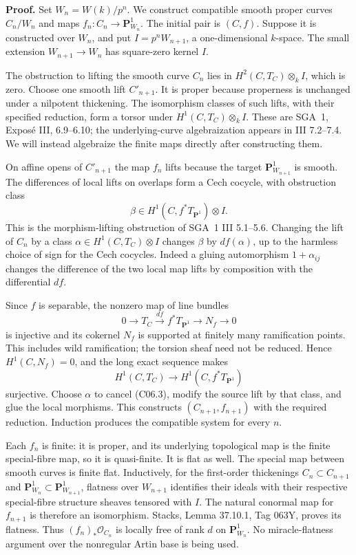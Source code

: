 \documentclass[11pt]{article}
\theoremstyle{remark}\newtheorem{remark}[theorem]{Remark}
\begin{document}
\textbf{Proof.}
Set $W_n=W(k)/p^n$. We construct compatible smooth proper
curves $C_n/W_n$ and maps $f_n:C_n\to\mathbf P^1_{W_n}$.
The initial pair is $(C,f)$. Suppose it is constructed over
$W_n$, and put $I=p^nW_{n+1}$, a one-dimensional $k$-space.
The small extension $W_{n+1}\to W_n$ has square-zero kernel $I$.

The obstruction to lifting the smooth curve $C_n$ lies in
$H^2(C,T_C)\otimes_k I$, which is zero. Choose one smooth lift
$C'_{n+1}$. It is proper because properness is unchanged under
a nilpotent thickening. The isomorphism classes of such lifts,
with their specified reduction, form a torsor under
$H^1(C,T_C)\otimes_k I$. These are SGA~1, Expos\'e III,
6.9--6.10; the underlying-curve algebraization appears in
III 7.2--7.4. We will instead algebraize the finite maps
directly after constructing them.

On affine opens of $C'_{n+1}$ the map $f_n$ lifts because the
target $\mathbf P^1_{W_{n+1}}$ is smooth. The differences of
local lifts on overlaps form a Cech cocycle, with obstruction
class
\[
                       \beta\in H^1(C,f^*T_{\mathbf P^1})\otimes I.
                                                               \tag{C06.3}
\]
This is the morphism-lifting obstruction of SGA~1 III 5.1--5.6.
Changing the lift of $C_n$ by a class
$\alpha\in H^1(C,T_C)\otimes I$ changes $\beta$ by
$df(\alpha)$, up to the harmless choice of sign for the
Cech cocycles. Indeed a gluing automorphism $1+\alpha_{ij}$
changes the difference of the two local map lifts by
composition with the differential $df$.

Since $f$ is separable, the nonzero map of line bundles
\[
       0\longrightarrow T_C\xrightarrow{df}f^*T_{\mathbf P^1}
                         \longrightarrow N_f\longrightarrow0
                                                               \tag{C06.4}
\]
is injective and its cokernel $N_f$ is supported at finitely
many ramification points. This includes wild ramification;
the torsion sheaf need not be reduced.
Hence $H^1(C,N_f)=0$, and the long exact sequence makes
\[
              H^1(C,T_C)\longrightarrow H^1(C,f^*T_{\mathbf P^1})
\]
surjective. Choose $\alpha$ to cancel (C06.3), modify the
source lift by that class, and glue the local morphisms.
This constructs $(C_{n+1},f_{n+1})$ with the required reduction.
Induction produces the compatible system for every $n$.

Each $f_n$ is finite: it is proper, and its underlying
topological map is the finite special-fibre map, so it is
quasi-finite. It is flat as well. The special map between
smooth curves is finite flat. Inductively, for the first-order
thickenings $C_n\subset C_{n+1}$ and
$\mathbf P^1_{W_n}\subset\mathbf P^1_{W_{n+1}}$, flatness
over $W_{n+1}$ identifies their ideals with their respective
special-fibre structure sheaves tensored with $I$.
The natural conormal map for $f_{n+1}$ is therefore an
isomorphism. Stacks, Lemma 37.10.1, Tag 063Y, proves its
flatness. Thus $(f_n)_*\mathcal O_{C_n}$ is locally free of
rank $d$ on $\mathbf P^1_{W_n}$. No miracle-flatness argument
over the nonregular Artin base is being used.
\end{document}
